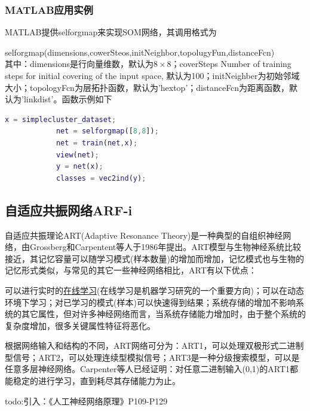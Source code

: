 {        \subsubsection{MATLAB应用实例}
            \par
            MATLAB提供selforgmap来实现SOM网络，其调用格式为
            \par
            selforgmap(dimensions,cowerSteos,initNeighbor,topolugyFun,distanceFcn)\\
            其中：dimensions是行向量维数，默认为$8\times 8$；coverSteps Number of training steps for initial covering of the input space, 默认为100；initNeighber为初始邻域大小；topologyFcn为层拓扑函数，默认为'hextop'；distanceFcn为距离函数，默认为'linkdist'。函数示例如下
            \begin{lstlisting}[language = Matlab]
            x = simplecluster_dataset;
            net = selforgmap([8,8]);
            net = train(net,x);
            view(net);
            y = net(x);
            classes = vec2ind(y);
            \end{lstlisting}

    \subsection{自适应共振网络ARF-i}
        \par
        自适应共振理论ART(Adaptive Resonance Theory)是一种典型的自组织神经网络，由Grossberg和Carpentent等人于1986年提出。ART模型与生物神经系统比较接近，其记忆容量可以随学习模式(样本数量)的增加而增加，记忆模式也与生物的记忆形式类似，与常见的其它一些神经网络相比，ART有以下优点：
        \par
        可以进行实时的\underline{在线学习}(在线学习是机器学习研究的一个重要方向)；可以在动态环境下学习；对已学习的模式(样本)可以快速得到结果；系统存储的增加不影响系统的其它属性，但对许多神经网络而言，当系统存储能力增加时，由于整个系统的复杂度增加，很多关键属性特征将恶化。
        \par
        根据网络输入和结构的不同，ART网络可分为：ART1，可以处理双极形式二进制型信号；ART2，可以处理连续型模拟信号；ART3是一种分级搜索模型，可以是任意多层神经网络。Carpenter等人已经证明：对任意二进制输入(0,1)的ART1都能稳定的进行学习，直到耗尽其存储能力为止。
        \par
        todo:引入：《人工神经网络原理》P109-P129

}
